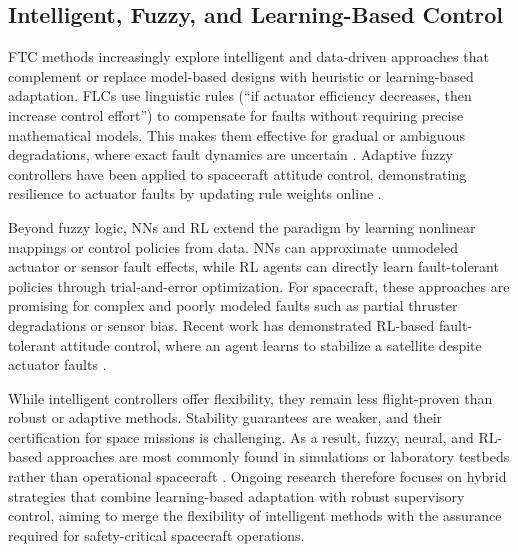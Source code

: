 \subsection{Intelligent, Fuzzy, and Learning-Based Control} 
\gls{FTC} methods increasingly explore intelligent and data-driven approaches that complement or replace model-based designs with heuristic or learning-based adaptation. \gls{FLC}s use linguistic rules (“if actuator efficiency decreases, then increase control effort”) to compensate for faults without requiring precise mathematical models. This makes them effective for gradual or ambiguous degradations, where exact fault dynamics are uncertain \cite{Zhang2008BibliographicalSystems,Yin2016ASystem}. Adaptive fuzzy controllers have been applied to spacecraft attitude control, demonstrating resilience to actuator faults by updating rule weights online\cite{Zou2011AdaptiveSpacecraft}
.

Beyond fuzzy logic, \gls{NN}s and \gls{RL} extend the paradigm by learning nonlinear mappings or control policies from data. \gls{NN}s can approximate unmodeled actuator or sensor fault effects, while \gls{RL} agents can directly learn fault-tolerant policies through trial-and-error optimization. For spacecraft, these approaches are promising for complex and poorly modeled faults such as partial thruster degradations or sensor bias. Recent work has demonstrated RL-based fault-tolerant attitude control, where an agent learns to stabilize a satellite despite actuator faults \cite{Rafiee2024ActiveFaults}.

While intelligent controllers offer flexibility, they remain less flight-proven than robust or adaptive methods. Stability guarantees are weaker, and their certification for space missions is challenging. As a result, fuzzy, neural, and RL-based approaches are most commonly found in simulations or laboratory testbeds rather than operational spacecraft \cite{Zhang2008BibliographicalSystems,Yin2016ASystem}. Ongoing research therefore focuses on hybrid strategies that combine learning-based adaptation with robust supervisory control, aiming to merge the flexibility of intelligent methods with the assurance required for safety-critical spacecraft operations.